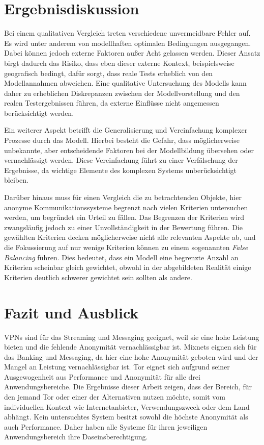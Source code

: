 \section{Ergebnisdiskussion}

Bei einem qualitativen Vergleich treten verschiedene unvermeidbare Fehler auf. Es wird unter anderem von modellhaften optimalen Bedingungen ausgegangen. Dabei können jedoch externe Faktoren außer Acht gelassen werden. Dieser Ansatz birgt dadurch das Risiko, dass eben dieser externe Kontext, beispielsweise geografisch bedingt, dafür sorgt, dass reale Tests erheblich von den Modellannahmen abweichen. Eine qualitative Untersuchung des Modells kann daher zu erheblichen Diskrepanzen zwischen der Modellvorstellung und den realen Testergebnissen führen, da externe Einflüsse nicht angemessen berücksichtigt werden.

Ein weiterer Aspekt betrifft die Generalisierung und Vereinfachung komplexer Prozesse durch das Modell. Hierbei besteht die Gefahr, dass möglicherweise unbekannte, aber entscheidende Faktoren bei der Modellbildung übersehen oder vernachlässigt werden. Diese Vereinfachung führt zu einer Verfälschung der Ergebnisse, da wichtige Elemente des komplexen Systems unberücksichtigt bleiben\cite{DisadvantagesOfQualitativApproaches}.

Darüber hinaus muss für einen Vergleich die zu betrachtenden Objekte, hier anonyme Kommunikationssysteme begrenzt nach vielen Kriterien untersuchen werden, um begründet ein Urteil zu fällen. Das Begrenzen der Kriterien wird zwangsläufig jedoch zu einer Unvollständigkeit in der Bewertung führen. Die gewählten Kriterien decken möglicherweise nicht alle relevanten Aspekte ab, und die Fokussierung auf nur wenige Kriterien können zu einem sogenannten \textit{False Balancing} führen. Dies bedeutet, dass ein Modell eine begrenzte Anzahl an Kriterien scheinbar gleich gewichtet, obwohl in der abgebildeten Realität einige Kriterien deutlich schwerer gewichtet sein sollten als andere.

\section{Fazit und Ausblick}

VPNs sind für das Streaming und Messaging geeignet, weil sie eine hohe Leistung bieten und die fehlende Anonymität vernachlässigbar ist.
Mixnets eignen sich für das Banking und Messaging, da hier eine hohe Anonymität geboten wird und der Mangel an Leistung vernachlässigbar ist.
Tor eignet sich aufgrund seiner Ausgewogenheit aus Performance und Anonymität für alle drei Anwendungsbereiche.
Die Ergebnisse dieser Arbeit zeigen, dass der Bereich, für den jemand Tor oder einer der Alternativen nutzen möchte, somit vom individuellen Kontext wie Internetanbieter, Verwendungszweck oder dem Land abhängt. Kein untersuchtes System besitzt sowohl die höchste Anonymität als auch Performance. Daher haben alle Systeme für ihren jeweiligen Anwendungsbereich ihre Daseinsberechtigung.

